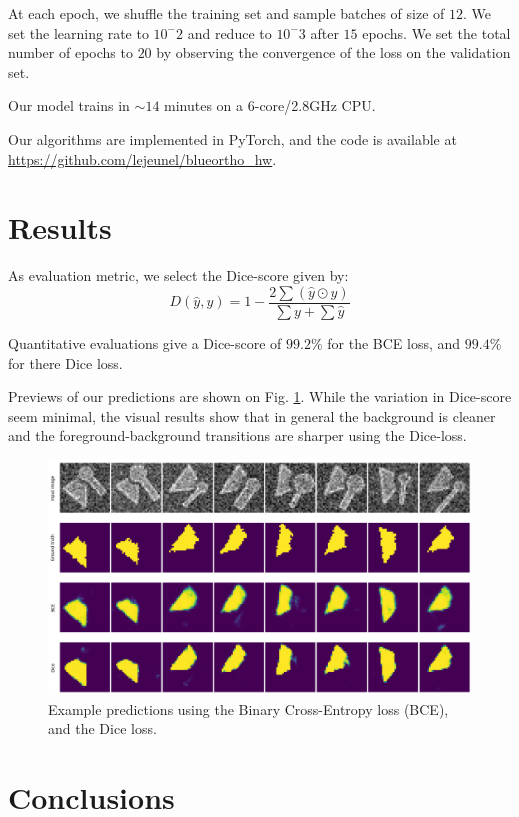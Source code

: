\documentclass[11pt]{article}
\begin{document}
At each epoch, we shuffle the training set and sample batches of size of \(12\).
We set the learning rate to \(10^-2\) and reduce to \(10^-3\) after \(15\) epochs.
We set the total number of epochs to \(20\) by observing the convergence of the loss
on the validation set.

Our model trains in \(\sim 14\) minutes on a 6-core/2.8GHz CPU.

Our algorithms are implemented in PyTorch, and the code is available at \url{https://github.com/lejeunel/blueortho\_hw}.

\section{Results}
\label{sec:org7579694}

As evaluation metric, we select the Dice-score given by:
\[
D(\hat{y}, y) = 1 - \frac{2 \sum(\hat{y} \odot y)}{\sum y + \sum \hat{y}}
\]

Quantitative evaluations give a Dice-score of \(99.2\%\) for the BCE loss, and \(99.4\%\) for there
Dice loss.

Previews of our predictions are shown on Fig. \ref{fig:test_prev}.
While the variation in Dice-score seem minimal, the visual results show that in general
the background is cleaner and the foreground-background transitions are sharper
using the Dice-loss.

\begin{figure}[htbp]
\centering
\includegraphics[width=.9\linewidth]{./test.png}
\caption{\label{fig:test_prev}Example predictions using the Binary Cross-Entropy loss (BCE), and the Dice loss.}
\end{figure}

\section{Conclusions}
\label{sec:org763e7d7}
\end{document}
